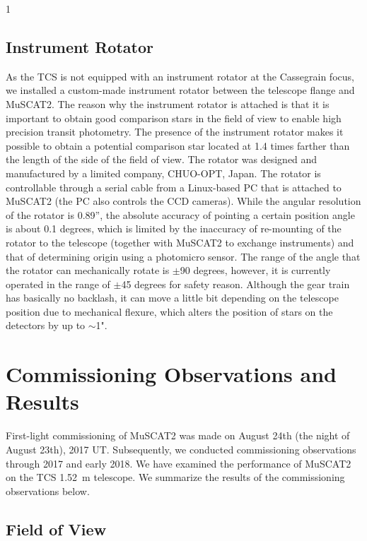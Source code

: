 \documentclass[a4paper,12pt]{spieman}  %
\begin{document}
\begin{spacing}{1}
\subsection{Instrument Rotator}

As the TCS is not equipped with an instrument rotator at the Cassegrain focus,
we installed a custom-made instrument rotator between the telescope flange and MuSCAT2.
The reason why the instrument rotator is attached is that it is important to obtain
good comparison stars in the field of view to enable high precision transit photometry.
The presence of the instrument rotator makes it possible to obtain a potential comparison
star located at 1.4 times farther than the length of the side of the field of view.
The rotator was designed and manufactured by a limited company, CHUO-OPT, Japan.
The rotator is controllable through a serial cable from a Linux-based PC that is attached
to MuSCAT2 (the PC also controls the CCD cameras).
While the angular resolution of the rotator is 0.89'', the absolute accuracy of pointing
a certain position angle is about 0.1 degrees, which is limited by the inaccuracy of
re-mounting of the rotator to the telescope (together with MuSCAT2 to exchange instruments)
and that of determining origin using a photomicro sensor.
The range of the angle that the rotator can mechanically rotate is $\pm$90 degrees,
however, it is currently operated in the range of $\pm$45 degrees for safety reason.
Although the gear train has basically no backlash, it can move a little bit depending on
the telescope position due to mechanical flexure, which alters the position of stars
on the detectors by up to $\sim$1".

\section{Commissioning Observations and Results}
\label{sect:test}  %

First-light commissioning of MuSCAT2 was made on August 24th (the night of August 23th), 2017 UT.
Subsequently, we conducted commissioning observations through 2017 and early 2018.
We have examined the performance of MuSCAT2 on the TCS 1.52~m telescope.
We summarize the results of the commissioning observations below.

\subsection{Field of View}


\end{spacing}
\end{document}
